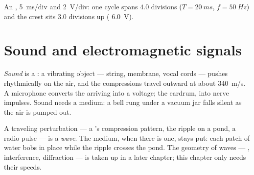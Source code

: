 \begin{omfigure}

{\small An ,  \qty{5}{ms}/div and  \qty{2}{V}/div:
one cycle spans $4.0$ divisions ($T = \qty{20}{ms}$, $f = \qty{50}{Hz}$)
and the crest sits $3.0$ divisions up ( \qty{6.0}{V}).}
\end{omfigure}

\section{Sound and electromagnetic signals}

\begin{definition}[Sound]\label{def:g10:signals-and-waves:sound}
\emph{Sound} is a  : a vibrating object ---
string, membrane, vocal cords --- pushes rhythmically on the air, and
the compressions travel outward at about \qty{340}{m/s}. A microphone
converts the arriving  into a voltage; the eardrum, into nerve
impulses. Sound needs a medium: a bell rung under a vacuum jar falls
silent as the air is pumped out.
\end{definition}

\begin{definition}[Wave]\label{def:g10:signals-and-waves:wave}
A traveling perturbation --- a 's compression pattern, the ripple
on a pond, a radio pulse --- is a \emph{wave}. The medium,
when there is one, stays put: each patch of water bobs in place while
the ripple crosses the pond. The geometry of waves --- ,
interference, diffraction --- is taken up in a later chapter; this
chapter only needs their speeds.
\end{definition}

